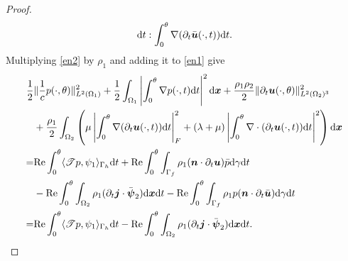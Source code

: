 \documentclass[final,leqno]{siamltex}
\begin{document}
\begin{proof}
\[{\rm d }t :
\int_0^{\theta} \nabla (\partial_t \bar {\boldsymbol u} (\cdot, t)) {\rm d} t.
\]
Multiplying \eqref{en2} by $\rho_1$ and adding it to \eqref{en1} give
\begin{align}
 \frac{1}{2}
 &\|\frac{1}{c} p (\cdot, \theta)\|^2_{L^2 (\Omega_1)} +\frac{1}{2}
\int_{\Omega_1} \left| \int_0^{\theta} \nabla p (\cdot, t) {\rm d} t \right|^2
{\rm d} \boldsymbol  x
 + \frac{\rho_1 \rho_2}{2}\| \partial_t\boldsymbol u (\cdot, \theta)\|^2_{L^2
(\Omega_2)^3}\nonumber\\
 &+\frac{\rho_1}{2} \int_{\Omega_2} \left( \mu \left| \int_0^{\theta} \nabla
(\partial_t \boldsymbol u (\cdot, t)) {\rm d} t \right|^2_{F} +
 (\lambda+\mu) \left| \int_0^{\theta} \nabla \cdot (\partial_t  \boldsymbol u
(\cdot, t)) {\rm d} t \right|^2\right) {\rm d} \boldsymbol  x \nonumber\\
 =&{\rm Re}\int_0^{\theta} \langle \mathscr T p, \psi_1 \rangle_{\Gamma_h} {\rm
d }t +{\rm Re}\int_0^{\theta} \int_{\Gamma_f} \rho_1 (\boldsymbol n \cdot
\partial_t \boldsymbol u)\bar p {\rm d} \gamma {\rm d} t\nonumber\\
 &- {\rm Re}\int_0^{\theta} \int_{\Omega_2} \rho_1(\partial_t \boldsymbol j
\cdot \bar {\boldsymbol \psi}_2) {\rm d} \boldsymbol x  {\rm d}t
 -{\rm Re}\int_0^{\theta} \int_{\Gamma_f} \rho_1 p (\boldsymbol n \cdot
\partial_t \bar {\boldsymbol u}) {\rm d} \gamma {\rm d} t \nonumber\\
 =&{\rm Re}\int_0^{\theta} \langle \mathscr T p, \psi_1 \rangle_{\Gamma_h} {\rm
d }t - {\rm Re}\int_0^{\theta} \int_{\Omega_2} \rho_1(\partial_t \boldsymbol j
\cdot\bar {\boldsymbol \psi}_2) {\rm d} \boldsymbol x  {\rm d}t.\label{int}
\end{align}


\end{proof}
\end{document}
